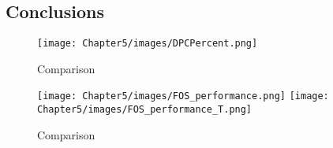 \subsection{Conclusions}


\begin{figure}[!h]
\centering
\texttt{[image: Chapter5/images/DPCPercent.png]}
\caption{Comparison}
\label{fig_comparison}
\end{figure}

\begin{figure}[!h]
\centering
\texttt{[image: Chapter5/images/FOS\_performance.png]}
\texttt{[image: Chapter5/images/FOS\_performance\_T.png]}
\caption{Comparison}
\label{fig_comparison1}
\end{figure}